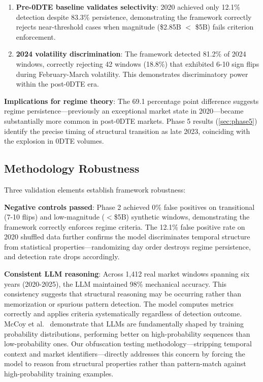 \vspace{0.1cm}

\begin{enumerate}
\item \textbf{Pre-0DTE baseline validates selectivity}: 2020 achieved only 12.1\% detection despite 83.3\% persistence, demonstrating the framework correctly rejects near-threshold cases when magnitude (\$2.85B $<$ \$5B) fails criterion enforcement.

\item \textbf{2024 volatility discrimination}: The framework detected 81.2\% of 2024 windows, correctly rejecting 42 windows (18.8\%) that exhibited 6-10 sign flips during February-March volatility. This demonstrates discriminatory power within the post-0DTE era.
\end{enumerate}

\vspace{0.2cm}

\noindent\textbf{Implications for regime theory}: The 69.1 percentage point difference suggests regime persistence—previously an exceptional market state in 2020—became substantially more common in post-0DTE markets. Phase 5 results (\ref{sec:phase5}) identify the precise timing of structural transition as late 2023, coinciding with the explosion in 0DTE volumes.

\subsection{Methodology Robustness}

\vspace{0.2cm}

Three validation elements establish framework robustness:

\vspace{0.2cm}

\noindent\textbf{Negative controls passed}: Phase 2 achieved 0\% false positives on transitional (7-10 flips) and low-magnitude ($<$\$5B) synthetic windows, demonstrating the framework correctly enforces regime criteria. The 12.1\% false positive rate on 2020 shuffled data further confirms the model discriminates temporal structure from statistical properties—randomizing day order destroys regime persistence, and detection rate drops accordingly.

\vspace{0.2cm}

\noindent\textbf{Consistent LLM reasoning}: Across 1,412 real market windows spanning six years (2020-2025), the LLM maintained 98\% mechanical accuracy. This consistency suggests that structural reasoning may be occurring rather than memorization or spurious pattern detection. The model computes metrics correctly and applies criteria systematically regardless of detection outcome. McCoy et al.~\cite{mccoy2023embers} demonstrate that LLMs are fundamentally shaped by training probability distributions, performing better on high-probability sequences than low-probability ones. Our obfuscation testing methodology—stripping temporal context and market identifiers—directly addresses this concern by forcing the model to reason from structural properties rather than pattern-match against high-probability training examples.


